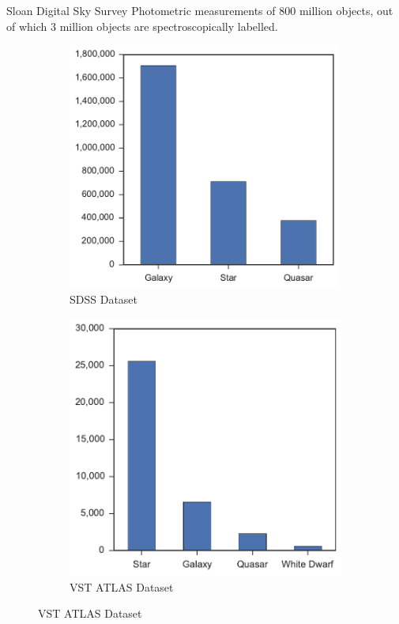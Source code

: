 \documentclass{beamer}
\begin{document}
\begin{frame}{Sloan Digital Sky Survey}
	Photometric measurements of 800 million objects, out of which
	3 million objects are spectroscopically labelled.
\begin{figure}[tbp]
	\centering
	\begin{subfigure}{.5\textwidth}
		\centering
		\includegraphics[width=0.99\textwidth]{../thesis/figures/2_astro/sdss_class_distribution}
		\caption{SDSS Dataset}
		\label{fig:class_dist_sdss}
	\end{subfigure}%
	\begin{subfigure}{.5\textwidth}
		\centering
		\includegraphics[width=0.99\linewidth]{../thesis/figures/2_astro/vstatlas_class_distribution}
		\caption{VST ATLAS Dataset}
		\label{fig:class_dist_vst}
	\end{subfigure}
	\label{fig:class_dist}
\end{figure}
\end{frame}
\end{document}
